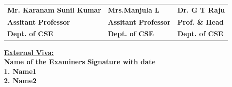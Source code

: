 \begin{titlepage}
{}
\begin{tabular}{l  l  l}
\textbf{Mr. Karanam Sunil Kumar} & \hspace{0.7cm}\textbf{Mrs.Manjula L} & \hspace{0.7cm}\textbf{Dr. G T Raju}\\
\textbf{Assitant Professor} & \hspace{0.7cm}\textbf{Assitant Professor}  & \hspace{0.7cm}\textbf{Prof. \& Head}\\
\textbf{Dept. of CSE} & \hspace{0.7cm}\textbf{Dept. of CSE}  & \hspace{0.7cm}\textbf{Dept. of CSE}\\[0.2in]
\end{tabular}
\textup{\underline{\textbf{External Viva:}}} \\ 
\textup{\textbf{Name of the Examiners}}\hspace{6cm} {\textbf{Signature with date}} \\[0.1in]
\textup{\textbf{1. Name1}} \\[0.4in]
\textup{\textbf{2. Name2}}
\end{titlepage}